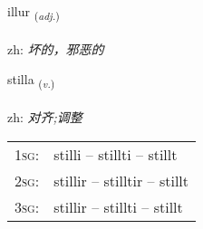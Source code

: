 \documentclass[frontgrid, backgrid]{flacards}\usepackage[]{graphicx}\usepackage[]{color}
\begin{document}
\renewcommand{\flhead}{\vskip5pt \fboxsep=0pt {\small\bfseries\footnotesize Lýsingarorð | 形容词}}
\renewcommand{\fcfoot}{\vskip5pt \fboxsep=0pt \hspace{2pt}{\small\bfseries\footnotesize 2K}}

\renewcommand{\blhead}{\vskip5pt {\small\bfseries\footnotesize Lýsingarorð | 形容词 }}
\renewcommand{\bcfoot}{\vskip5pt \hspace{2pt}{\small\bfseries\footnotesize 2K}}


{illur \small{\textsubscript{(\textit{adj.})}} \\[1ex] %
\textphonetic{[ɪtlʏr]} \\
zh: \emph{坏的，邪恶的} \\  [2ex]
\renewcommand*{\arraystretch}{0.8}
}

\renewcommand{\flhead}{\vskip5pt \fboxsep=0pt {\small\bfseries\footnotesize Sagnorð | 动词}}
\renewcommand{\fcfoot}{\vskip5pt \fboxsep=0pt \hspace{2pt}{\small\bfseries\footnotesize 2K}}

\renewcommand{\blhead}{\vskip5pt {\small\bfseries\footnotesize Sagnorð | 动词 }}
\renewcommand{\bcfoot}{\vskip5pt \hspace{2pt}{\small\bfseries\footnotesize 2K}}


{stilla \small{\textsubscript{(\textit{v.})}} \\[1ex] %
\textphonetic{[stɪtla]} \\
zh: \emph{对齐;调整} \\  [2ex]
\renewcommand*{\arraystretch}{0.8}
\begin{tabular}{p{1cm}l}
\textsc{1sg}: & stilli -- stillti -- stillt \\ 
\textsc{2sg}: & stillir -- stilltir -- stillt \\ 
\textsc{3sg}: & stillir -- stillti -- stillt \\ 
\end{tabular}
}
\end{document}
